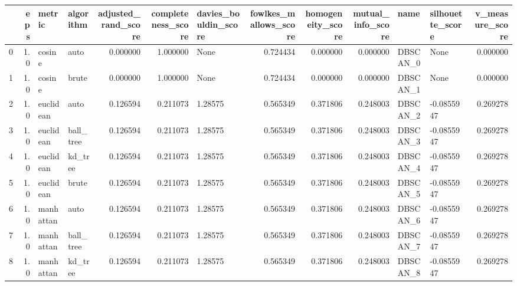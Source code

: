 \begin{tabular}{lrllrrlrrrllr}
\toprule
{} &  eps &     metric &  algorithm &  adjusted\_rand\_score &  completeness\_score & davies\_bouldin\_score &  fowlkes\_mallows\_score &  homogeneity\_score &  mutual\_info\_score &       name & silhouette\_score &  v\_measure\_score \\
\midrule
0  &  1.0 &     cosine &       auto &             0.000000 &            1.000000 &                 None &               0.724434 &           0.000000 &           0.000000 &   DBSCAN\_0 &             None &         0.000000 \\
1  &  1.0 &     cosine &      brute &             0.000000 &            1.000000 &                 None &               0.724434 &           0.000000 &           0.000000 &   DBSCAN\_1 &             None &         0.000000 \\
2  &  1.0 &  euclidean &       auto &             0.126594 &            0.211073 &              1.28575 &               0.565349 &           0.371806 &           0.248003 &   DBSCAN\_2 &       -0.0855947 &         0.269278 \\
3  &  1.0 &  euclidean &  ball\_tree &             0.126594 &            0.211073 &              1.28575 &               0.565349 &           0.371806 &           0.248003 &   DBSCAN\_3 &       -0.0855947 &         0.269278 \\
4  &  1.0 &  euclidean &    kd\_tree &             0.126594 &            0.211073 &              1.28575 &               0.565349 &           0.371806 &           0.248003 &   DBSCAN\_4 &       -0.0855947 &         0.269278 \\
5  &  1.0 &  euclidean &      brute &             0.126594 &            0.211073 &              1.28575 &               0.565349 &           0.371806 &           0.248003 &   DBSCAN\_5 &       -0.0855947 &         0.269278 \\
6  &  1.0 &  manhattan &       auto &             0.126594 &            0.211073 &              1.28575 &               0.565349 &           0.371806 &           0.248003 &   DBSCAN\_6 &       -0.0855947 &         0.269278 \\
7  &  1.0 &  manhattan &  ball\_tree &             0.126594 &            0.211073 &              1.28575 &               0.565349 &           0.371806 &           0.248003 &   DBSCAN\_7 &       -0.0855947 &         0.269278 \\
8  &  1.0 &  manhattan &    kd\_tree &             0.126594 &            0.211073 &              1.28575 &               0.565349 &           0.371806 &           0.248003 &   DBSCAN\_8 &       -0.0855947 &         0.269278 \\

\end{tabular}
